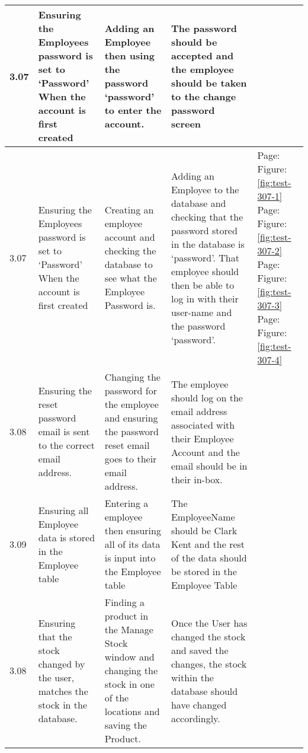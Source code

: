 \begin{flushleft}
\begin{longtable}{|p{1cm}|p{2.5cm}|p{2.5cm}|p{2cm}|p{2cm}|}
	\rowcolor{dark-grey}3.07 & Ensuring the Employees password is set to `Password' When the account is first created & Adding an Employee then using the password `password' to enter the account. & The password should be accepted and the employee should be taken to the change password screen& \\ \hline
	\rowcolor{light-grey}3.07 & Ensuring the Employees password is set to `Password' When the account is first created & Creating an employee account and checking the database to see what the Employee Password is. & Adding an Employee to the database and checking that the password stored in the database is `password'. That employee should then be able to log in with their user-name and the password `password'. & Page: \pageref{fig:test-307-1} \newline Figure: \ref{fig:test-307-1} \newline \newline Page: \pageref{fig:test-307-2} \newline Figure: \ref{fig:test-307-2} \newline \newline  Page: \pageref{fig:test-307-3} \newline Figure: \ref{fig:test-307-3} \newline \newline  Page: \pageref{fig:test-307-4} \newline Figure: \ref{fig:test-307-4}\\ \hline
	\rowcolor{dark-grey}3.08 & Ensuring the reset password email is sent to the correct email address. & Changing the password for the employee and ensuring the password reset email goes to their email address. & The employee should log on the email address associated with their Employee Account and the email should be in their in-box.& \\ \hline
	\rowcolor{dark-grey}3.09 & Ensuring all Employee data is stored in the Employee table & Entering a employee then ensuring all of its data is input into the Employee table & The EmployeeName should be Clark Kent and the rest of the data should be stored in the Employee Table & \\ \hline
	\rowcolor{light-grey}3.08 & Ensuring that the stock changed by the user, matches the stock in the database. & Finding a product in the Manage Stock window and changing the stock in one of the locations and saving the Product. & Once the User has changed the stock and saved the changes, the stock within the database should have changed accordingly. &  \\ \hline

\end{longtable}
\end{flushleft}
